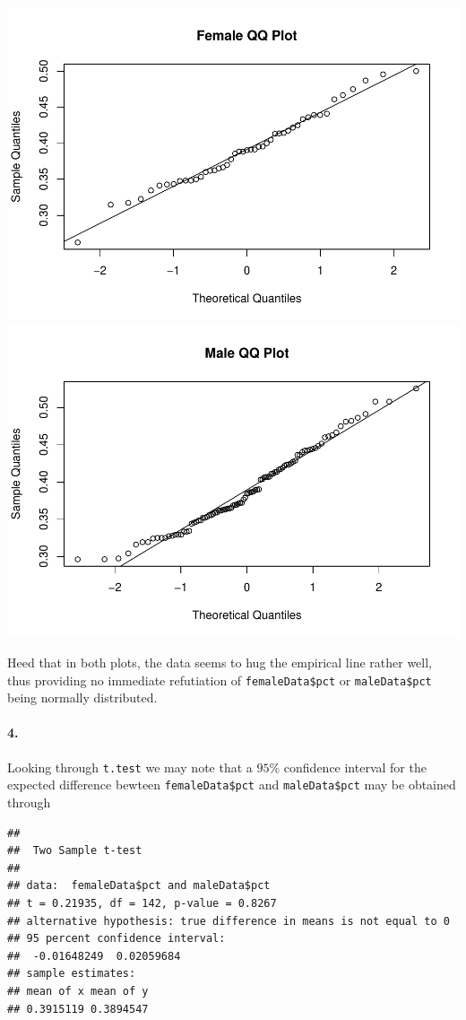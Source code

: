 \documentclass[
]{article}
\newenvironment{Shaded}{\begin{snugshade}}{\end{snugshade}}
\newcommand{\DataTypeTok}[1]{\textcolor[rgb]{0.13,0.29,0.53}{#1}}
\newcommand{\KeywordTok}[1]{\textcolor[rgb]{0.13,0.29,0.53}{\textbf{#1}}}
\newcommand{\NormalTok}[1]{#1}
\newcommand{\OperatorTok}[1]{\textcolor[rgb]{0.81,0.36,0.00}{\textbf{#1}}}
\begin{document}
\includegraphics[width=0.5\linewidth]{matstatproblems20-21_files/figure-latex/unnamed-chunk-21-1}
\includegraphics[width=0.5\linewidth]{matstatproblems20-21_files/figure-latex/unnamed-chunk-21-2}

Heed that in both plots, the data seems to hug the empirical line rather
well, thus providing no immediate refutiation of
\texttt{femaleData\$pct} or \texttt{maleData\$pct} being normally
distributed.

\hypertarget{section-12}{%
\paragraph{\texorpdfstring{\textbf{4.}}{4.}}\label{section-12}}

Looking through \texttt{t.test} we may note that a \(95\%\) confidence
interval for the expected difference bewteen \texttt{femaleData\$pct}
and \texttt{maleData\$pct} may be obtained through

\begin{Shaded}
\end{Shaded}

\begin{verbatim}
## 
##  Two Sample t-test
## 
## data:  femaleData$pct and maleData$pct
## t = 0.21935, df = 142, p-value = 0.8267
## alternative hypothesis: true difference in means is not equal to 0
## 95 percent confidence interval:
##  -0.01648249  0.02059684
## sample estimates:
## mean of x mean of y 
## 0.3915119 0.3894547
\end{verbatim}
\end{document}
